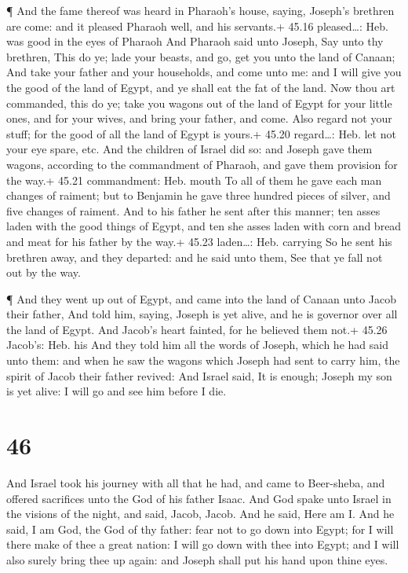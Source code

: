  ¶ And the fame thereof was heard in Pharaoh's house,
saying, Joseph's brethren are come: and it pleased Pharaoh well, and his
servants.+ 45.16 pleased\ldots: Heb. was good in the eyes of Pharaoh
 And Pharaoh said unto Joseph, Say unto thy brethren, This
do ye; lade your beasts, and go, get you unto the land of Canaan;
 And take your father and your households, and come unto
me: and I will give you the good of the land of Egypt, and ye shall eat
the fat of the land.  Now thou art commanded, this do ye;
take you wagons out of the land of Egypt for your little ones, and for
your wives, and bring your father, and come.  Also regard
not your stuff; for the good of all the land of Egypt is yours.+ 45.20
regard\ldots: Heb. let not your eye spare, etc.  And the
children of Israel did so: and Joseph gave them wagons, according to the
commandment of Pharaoh, and gave them provision for the way.+ 45.21
commandment: Heb. mouth  To all of them he gave each man
changes of raiment; but to Benjamin he gave three hundred pieces of
silver, and five changes of raiment.  And to his father he
sent after this manner; ten asses laden with the good things of Egypt,
and ten she asses laden with corn and bread and meat for his father by
the way.+ 45.23 laden\ldots: Heb. carrying  So he sent his
brethren away, and they departed: and he said unto them, See that ye
fall not out by the way.

 ¶ And they went up out of Egypt, and came into the land of
Canaan unto Jacob their father,  And told him, saying,
Joseph is yet alive, and he is governor over all the land of Egypt. And
Jacob's heart fainted, for he believed them not.+ 45.26 Jacob's: Heb.
his  And they told him all the words of Joseph, which he
had said unto them: and when he saw the wagons which Joseph had sent to
carry him, the spirit of Jacob their father revived:  And
Israel said, It is enough; Joseph my son is yet alive: I will go and see
him before I die.

\hypertarget{section-45}{%
\section{46}\label{section-45}}

 And Israel took his journey with all that he had, and came
to Beer-sheba, and offered sacrifices unto the God of his father Isaac.
 And God spake unto Israel in the visions of the night, and
said, Jacob, Jacob. And he said, Here am I.  And he said, I
am God, the God of thy father: fear not to go down into Egypt; for I
will there make of thee a great nation:  I will go down with
thee into Egypt; and I will also surely bring thee up again: and Joseph
shall put his hand upon thine eyes.

